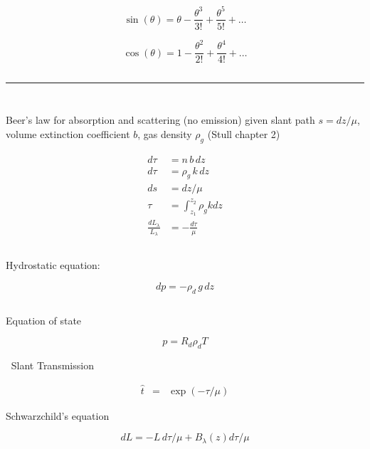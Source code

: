 \documentclass[12pt]{article}
\begin{document}
\begin{multicols}{2}
\begin{equation}
  \sin(\theta) = \theta - \frac{\theta^3}{3!} + \frac{\theta^5}{5!} + \ldots
\end{equation}

\begin{equation}
  \cos(\theta) = 1 -  \frac{\theta^2}{2!} + \frac{\theta^4}{4!} + \ldots
\end{equation}

$~$

\vspace{0.5in}


\noindent
\rule{3cm}{.1mm}

$~$


\noindent

$~$

\noindent
Beer's law for absorption and scattering (no emission) given
slant path $s= dz/\mu$, volume extinction coefficient $b$,
gas density $\rho_g$ (Stull chapter 2)

\begin{align}
  d\tau &= n\,b\,dz \\
  d\tau &= \rho_g\,k\,dz \\
  ds &= dz/\mu \\
  \tau & = \int_{z_1}^{z_2} \rho_g k dz \\
\frac{dL_\lambda}{L_\lambda}  & =  - \frac{d\tau}{\mu} 
\end{align}               


$~$

\noindent
Hydrostatic equation:

\begin{equation}
  \label{eq:hydro}
  dp = -\rho_d\, g\, dz
\end{equation}

$~$

\noindent
Equation of state

\begin{equation}
  \label{eq:state}
  p = R_d \rho_d T
\end{equation}


$~$
\noindent
Slant Transmission 

\begin{eqnarray}
\hat{t}  &=& \exp ( - \tau/\mu ) 
\end{eqnarray}
$~$

\noindent
Schwarzchild's equation

\begin{equation}
  \label{eq:schwarz}
  dL = -L\, d\tau/\mu  + B_{\lambda}(z) d\tau/\mu
\end{equation}
$~$


\end{multicols}
\end{document}
